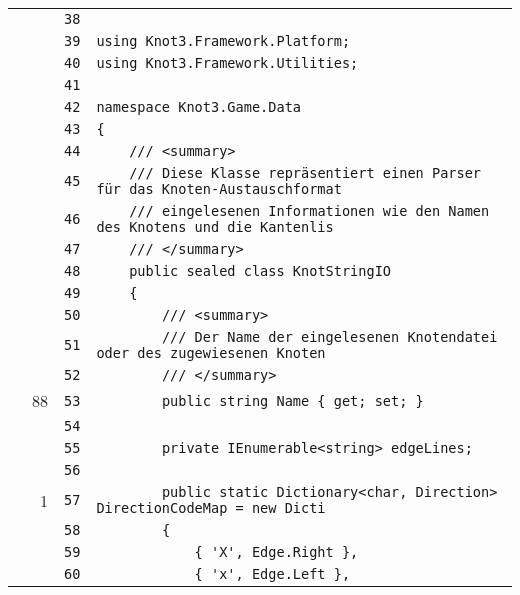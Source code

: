 \documentclass[a4paper,10pt]{article}
\begin{document}
\begin{longtable}[l]{lrrl}
\cellcolor{gray} &  & \verb~38~ & \verb~~\\
\cellcolor{gray} &  & \verb~39~ & \verb~using Knot3.Framework.Platform;~\\
\cellcolor{gray} &  & \verb~40~ & \verb~using Knot3.Framework.Utilities;~\\
\cellcolor{gray} &  & \verb~41~ & \verb~~\\
\cellcolor{gray} &  & \verb~42~ & \verb~namespace Knot3.Game.Data~\\
\cellcolor{gray} &  & \verb~43~ & \verb~{~\\
\cellcolor{gray} &  & \verb~44~ & \verb~    /// <summary>~\\
\cellcolor{gray} &  & \verb~45~ & \verb~    /// Diese Klasse repräsentiert einen Parser für das Knoten-Austauschformat~\\
\cellcolor{gray} &  & \verb~46~ & \verb~    /// eingelesenen Informationen wie den Namen des Knotens und die Kantenlis~\\
\cellcolor{gray} &  & \verb~47~ & \verb~    /// </summary>~\\
\cellcolor{gray} &  & \verb~48~ & \verb~    public sealed class KnotStringIO~\\
\cellcolor{gray} &  & \verb~49~ & \verb~    {~\\
\cellcolor{gray} &  & \verb~50~ & \verb~        /// <summary>~\\
\cellcolor{gray} &  & \verb~51~ & \verb~        /// Der Name der eingelesenen Knotendatei oder des zugewiesenen Knoten~\\
\cellcolor{gray} &  & \verb~52~ & \verb~        /// </summary>~\\
\cellcolor{green} & 88 & \verb~53~ & \verb~        public string Name { get; set; }~\\
\cellcolor{gray} &  & \verb~54~ & \verb~~\\
\cellcolor{gray} &  & \verb~55~ & \verb~        private IEnumerable<string> edgeLines;~\\
\cellcolor{gray} &  & \verb~56~ & \verb~~\\
\cellcolor{green} & 1 & \verb~57~ & \verb~        public static Dictionary<char, Direction> DirectionCodeMap = new Dicti~\\
\cellcolor{gray} &  & \verb~58~ & \verb~        {~\\
\cellcolor{gray} &  & \verb~59~ & \verb~            { 'X', Edge.Right },~\\
\cellcolor{gray} &  & \verb~60~ & \verb~            { 'x', Edge.Left },~\\

\end{longtable}
\end{document}
